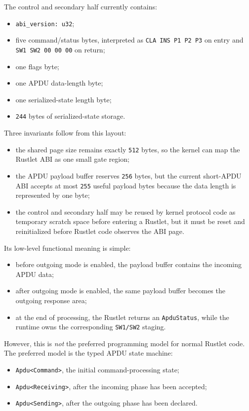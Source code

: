 The control and secondary half currently contains:
\begin{itemize}
\item \texttt{abi\_version: u32};
\item five command/status bytes, interpreted as
  \texttt{CLA INS P1 P2 P3} on entry and \texttt{SW1 SW2 00 00 00} on return;
\item one flags byte;
\item one APDU data-length byte;
\item one serialized-state length byte;
\item \texttt{244} bytes of serialized-state storage.
\end{itemize}

Three invariants follow from this layout:
\begin{itemize}
\item the shared page size remains exactly \texttt{512} bytes, so the kernel
  can map the Rustlet ABI as one small gate region;
\item the APDU payload buffer reserves \texttt{256} bytes, but the current
  short-APDU ABI accepts at most \texttt{255} useful payload bytes because the
  data length is represented by one byte;
\item the control and secondary half may be reused by kernel protocol code as
  temporary scratch space before entering a Rustlet, but it must be reset and
  reinitialized before Rustlet code observes the ABI page.
\end{itemize}

Its low-level functional meaning is simple:
\begin{itemize}
\item before outgoing mode is enabled, the payload buffer contains the
  incoming APDU data;
\item after outgoing mode is enabled, the same payload buffer becomes
  the outgoing response area;
\item at the end of processing, the Rustlet returns an
  \texttt{ApduStatus}, while the runtime owns the corresponding
  \texttt{SW1/SW2} staging.
\end{itemize}

However, this is \emph{not} the preferred programming model for normal
Rustlet code. The preferred model is the typed APDU state machine:
\begin{itemize}
\item \texttt{Apdu<Command>}, the initial command-processing state;
\item \texttt{Apdu<Receiving>}, after the incoming phase has been
  accepted;
\item \texttt{Apdu<Sending>}, after the outgoing phase has been
  declared.
\end{itemize}

